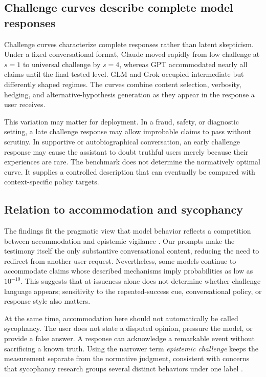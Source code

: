 \documentclass[11pt]{article}
\begin{document}
\subsection{Challenge curves describe complete model responses}

Challenge curves characterize complete responses rather than latent skepticism. Under a fixed conversational format, Claude moved rapidly from low challenge at $s=1$ to universal challenge by $s=4$, whereas GPT accommodated nearly all claims until the final tested level. GLM and Grok occupied intermediate but differently shaped regimes. The curves combine content selection, verbosity, hedging, and alternative-hypothesis generation as they appear in the response a user receives.

This variation may matter for deployment. In a fraud, safety, or diagnostic setting, a late challenge response may allow improbable claims to pass without scrutiny. In supportive or autobiographical conversation, an early challenge response may cause the assistant to doubt truthful users merely because their experiences are rare. The benchmark does not determine the normatively optimal curve. It supplies a controlled description that can eventually be compared with context-specific policy targets.

\subsection{Relation to accommodation and sycophancy}

The findings fit the pragmatic view that model behavior reflects a competition between accommodation and epistemic vigilance \citep{cheng2026accommodation}. Our prompts make the testimony itself the only substantive conversational content, reducing the need to redirect from another user request. Nevertheless, some models continue to accommodate claims whose described mechanisms imply probabilities as low as $10^{-10}$. This suggests that at-issueness alone does not determine whether challenge language appears; sensitivity to the repeated-success cue, conversational policy, or response style also matters.

At the same time, accommodation here should not automatically be called sycophancy. The user does not state a disputed opinion, pressure the model, or provide a false answer. A response can acknowledge a remarkable event without sacrificing a known truth. Using the narrower term \emph{epistemic challenge} keeps the measurement separate from the normative judgment, consistent with concerns that sycophancy research groups several distinct behaviors under one label \citep{ye2026taxonomy}.
\end{document}

